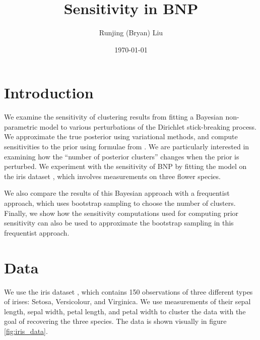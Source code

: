 \documentclass[a4paper]{article}
\title{Sensitivity in BNP}
\author{Runjing (Bryan) Liu}
\date{\today}
\begin{document}
\maketitle
\tableofcontents
\newpage
\section{Introduction}

We examine the sensitivity of clustering results from fitting a
Bayesian non-parametric model to various perturbations of
the Dirichlet stick-breaking process.
We approximate the true posterior using variational methods, and compute
sensitivities to the prior using formulae from \cite{giordano_2017}.
We are particularly interested in examining how the ``number of posterior
clusters'' changes when the prior is perturbed. We experiment with the sensitivity
of BNP by fitting the model on the iris dataset
\cite{iris_dataset}, which
involves measurements on three flower species.

We also compare the results of this Bayesian approach with a frequentist approach,
which uses bootstrap sampling to choose the number of clusters. Finally, we
show how the sensitivity computations used for computing prior sensitivity can
also be used to approximate the bootstrap sampling in this frequentist approach.


\section{Data}
We use the iris dataset \cite{iris_dataset}, which contains 150 observations of
three different types
of irises: Setosa, Versicolour, and Virginica. We use measurements of their
sepal length, sepal width, petal length, and petal width to cluster the data with
the goal of recovering the three species. The data is shown visually in figure \ref{fig:iris_data}.
\end{document}

